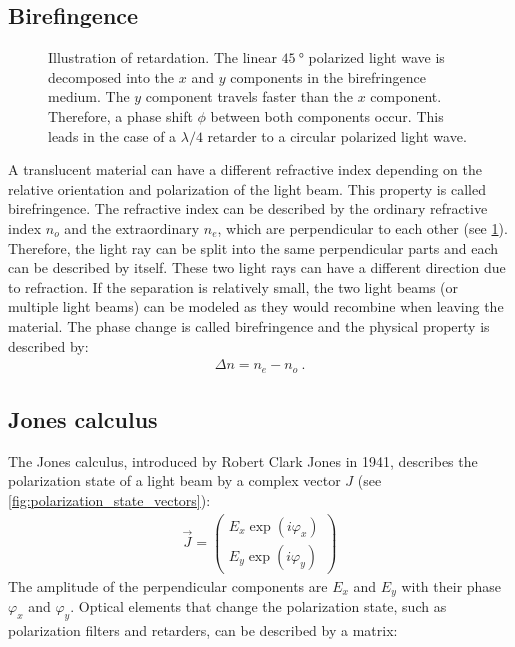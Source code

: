\subsection{Birefingence}
%
\begin{figure}[!t]
\centering
\setlength{\tikzwidth}{\textwidth}
\caption{Illustration of retardation. The linear $\SI{45}{\degree}$ polarized light wave is decomposed into the $x$ and $y$ components in the birefringence medium. The $y$ component travels faster than the $x$ component. Therefore, a phase shift $\phi$ between both components occur. This leads in the case of a $\lambda/4$ retarder to a circular polarized light wave.}
\label{fig:optic_retardation}
\end{figure}
%
A translucent material can have a different refractive index depending on the relative orientation and polarization of the light beam.
This property is called birefringence.
The refractive index can be described by the ordinary refractive index $n_o$ and the extraordinary $n_e$, which are perpendicular to each other (see \cref{fig:optic_retardation}).
Therefore, the light ray can be split into the same perpendicular parts and each can be described by itself.
These two light rays can have a different direction due to refraction.
If the separation is relatively small, the two light beams (or multiple light beams) can be modeled as they would recombine when leaving the material.
The phase change is called birefringence and the physical property is described by:
%
\begin{align}
    \Delta n = n_e - n_o \> .
\end{align}
%
%
%
\subsection{Jones calculus}
\label{sec:jones}
% 
The Jones calculus, introduced by Robert Clark Jones in 1941, describes the polarization state of a light beam by a complex vector $J$ (see \cref{fig:polarization_state_vectors}):
%
\begin{align}
    \vec{J} = \begin{pmatrix} E_x \exp(i \varphi_x) \\ E_y \exp(i \varphi_y) \end{pmatrix}
\end{align}
%
The amplitude of the perpendicular components are $E_x$ and $E_y$ with their phase $\varphi_x$ and $\varphi_y$.
Optical elements that change the polarization state, such as polarization filters and retarders, can be described by a matrix:
%
